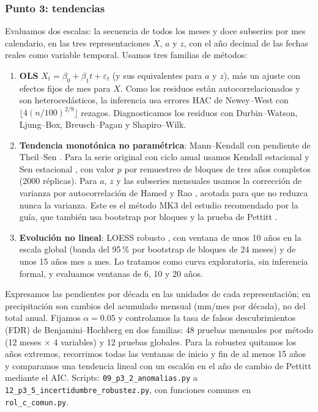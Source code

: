 \documentclass[11pt,a4paper]{article}
\newcommand{\archivo}[1]{\nolinkurl{#1}}
\begin{document}
\subsubsection{Punto 3: tendencias}
\label{sec:met_p3}
Evaluamos dos escalas: la secuencia de todos los meses y doce subseries por mes calendario, en las tres representaciones $X$, $a$ y $z$, con el año decimal de las fechas reales como variable temporal. Usamos tres familias de métodos:
\begin{enumerate}
\item \textbf{OLS} $X_t=\beta_0+\beta_1t+\varepsilon_t$ (y sus equivalentes para $a$ y $z$), más un ajuste con efectos fijos de mes para $X$. Como los residuos están autocorrelacionados y son heterocedásticos, la inferencia usa errores HAC de Newey--West \citep{NeweyWest1987} con $\lfloor4(n/100)^{2/9}\rfloor$ rezagos. Diagnosticamos los residuos con Durbin--Watson, Ljung--Box, Breusch--Pagan y Shapiro--Wilk.
\item \textbf{Tendencia monotónica no paramétrica}: Mann--Kendall \citep{Mann1945,Kendall1975} con pendiente de Theil--Sen \citep{Sen1968}. Para la serie original con ciclo anual usamos Kendall estacional y Sen estacional \citep{Hirsch1982}, con valor $p$ por remuestreo de bloques de tres años completos (2000 réplicas). Para $a$, $z$ y las subseries mensuales usamos la corrección de varianza por autocorrelación de Hamed y Rao \citep{HamedRao1998}, acotada para que no reduzca nunca la varianza. Este es el método MK3 del estudio recomendado por la guía, que también usa bootstrap por bloques y la prueba de Pettitt \citep{Amirthanathan2023}.
\item \textbf{Evolución no lineal}: LOESS robusto \citep{Cleveland1979}, con ventana de unos 10 años en la escala global (banda del 95\,\% por bootstrap de bloques de 24 meses) y de unos 15 años mes a mes. Lo tratamos como curva exploratoria, sin inferencia formal, y evaluamos ventanas de 6, 10 y 20 años.
\end{enumerate}
Expresamos las pendientes por década en las unidades de cada representación; en precipitación son cambios del acumulado mensual (mm/mes por década), no del total anual. Fijamos $\alpha=0.05$ y controlamos la tasa de falsos descubrimientos (FDR) de Benjamini--Hochberg \citep{BH1995} en dos familias: 48 pruebas mensuales por método (12 meses $\times$ 4 variables) y 12 pruebas globales. Para la robustez quitamos los años extremos, recorrimos todas las ventanas de inicio y fin de al menos 15 años y comparamos una tendencia lineal con un escalón en el año de cambio de Pettitt \citep{Pettitt1979} mediante el AIC. Scripts: \archivo{09_p3_2_anomalias.py} a \archivo{12_p3_5_incertidumbre_robustez.py}, con funciones comunes en \archivo{rol_c_comun.py}.
\end{document}
